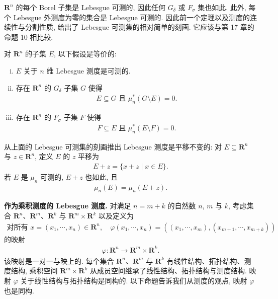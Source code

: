 \documentclass[../../main.tex]{subfiles}
\begin{document}
$\mathbf{R}^{n}$ 的每个 Borel 子集是 Lebesgue 可测的, 因此任何 $G_{\delta}$ 或 $F_{\sigma}$ 集也如此. 此外, 每个 Lebesgue 外测度为零的集合是 Lebesgue 可测的. 因此前一个定理以及测度的连续性与分割性质, 给出了 Lebesgue 可测集的相对简单的刻画. 它应该与第 17 章的命题 10 相比较.

\begin{corollary}\label{corollary:ch20-可测集刻画}
对 $\mathbf{R}^{n}$ 的子集 $E$, 以下假设是等价的:
\begin{enumerate}[(i)]
\item $E$ 关于 $n$ 维 Lebesgue 测度是可测的.
\item 存在 $\mathbf{R}^{n}$ 的 $G_{\delta}$ 子集 $G$ 使得
\begin{align*}
E\subseteq G\text{ 且 }\mu_{n}^{*}(G\setminus E)=0.
\end{align*}
\item 存在 $\mathbf{R}^{n}$ 的 $F_{\sigma}$ 子集 $F$ 使得
\begin{align*}
F\subseteq E\text{ 且 }\mu_{n}^{*}(E\setminus F)=0.
\end{align*}
\end{enumerate}
\end{corollary}

从上面的 Lebesgue 可测集的刻画推出 Lebesgue 测度是平移不变的: 对 $E\subseteq\mathbf{R}^{n}$ 与 $z\in\mathbf{R}^{n}$, 定义 $E$ 的 $z$ 平移为
\begin{align*}
E+z=\{x+z\mid x\in E\}.
\end{align*}
若 $E$ 是 $\mu_{n}$ 可测的, $E+z$ 也如此, 且
\begin{align*}
\mu_{n}(E)=\mu_{n}(E+z).
\end{align*}

\textbf{作为乘积测度的 Lebesgue 测度.} 对满足 $n=m+k$ 的自然数 $n$, $m$ 与 $k$, 考虑集合 $\mathbf{R}^{n}$、$\mathbf{R}^{m}$、$\mathbf{R}^{k}$ 与 $\mathbf{R}^{m}\times\mathbf{R}^{k}$ 以及定义为
\begin{align}\label{align:ch20-坐标分解}
\text{对所有 }x=(x_{1},\cdots,x_{n})\in\mathbf{R}^{n},\quad\varphi(x_{1},\cdots,x_{n})=((x_{1},\cdots,x_{m}),(x_{m+1},\cdots,x_{m+k}))
\end{align}
的映射
\begin{align*}
\varphi:\mathbf{R}^{n}\to\mathbf{R}^{m}\times\mathbf{R}^{k}.
\end{align*}
该映射是一对一与映上的. 每个集合 $\mathbf{R}^{n}$、$\mathbf{R}^{m}$ 与 $\mathbf{R}^{k}$ 有线性结构、拓扑结构、测度结构, 乘积空间 $\mathbf{R}^{m}\times\mathbf{R}^{k}$ 从成员空间继承了线性结构、拓扑结构与测度结构. 映射 $\varphi$ 关于线性结构与拓扑结构是同构的. 以下命题告诉我们从测度的观点, 映射 $\varphi$ 也是同构.
\end{document}
